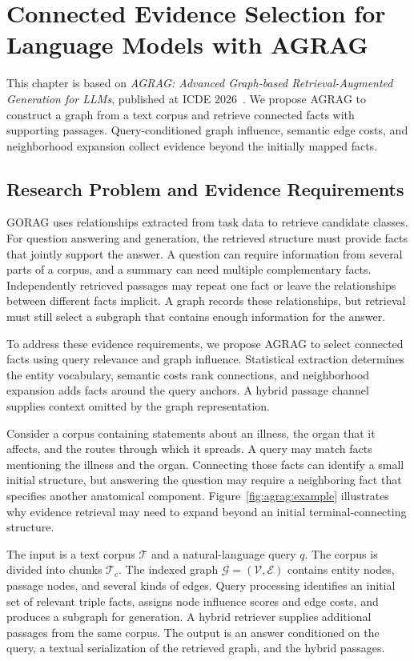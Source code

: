 \chapter{Connected Evidence Selection for Language Models with AGRAG}
\label{ch:agrag}

This chapter is based on \emph{AGRAG: Advanced Graph-based Retrieval-Augmented Generation for LLMs}, published at ICDE 2026~\cite{agrag-paper}. We propose AGRAG to construct a graph from a text corpus and retrieve connected facts with supporting passages. Query-conditioned graph influence, semantic edge costs, and neighborhood expansion collect evidence beyond the initially mapped facts.

\section{Research Problem and Evidence Requirements}
\label{sec:agrag:problem}
GORAG uses relationships extracted from task data to retrieve candidate classes. For question answering and generation, the retrieved structure must provide facts that jointly support the answer. A question can require information from several parts of a corpus, and a summary can need multiple complementary facts. Independently retrieved passages may repeat one fact or leave the relationships between different facts implicit. A graph records these relationships, but retrieval must still select a subgraph that contains enough information for the answer.

To address these evidence requirements, we propose AGRAG to select connected facts using query relevance and graph influence. Statistical extraction determines the entity vocabulary, semantic costs rank connections, and neighborhood expansion adds facts around the query anchors. A hybrid passage channel supplies context omitted by the graph representation.

Consider a corpus containing statements about an illness, the organ that it affects, and the routes through which it spreads. A query may match facts mentioning the illness and the organ. Connecting those facts can identify a small initial structure, but answering the question may require a neighboring fact that specifies another anatomical component. Figure~\ref{fig:agrag:example} illustrates why evidence retrieval may need to expand beyond an initial terminal-connecting structure.

The input is a text corpus $\mathcal{T}$ and a natural-language query $q$. The corpus is divided into chunks $\mathcal{T}_c$. The indexed graph $\mathcal{G}=(\mathcal{V},\mathcal{E})$ contains entity nodes, passage nodes, and several kinds of edges. Query processing identifies an initial set of relevant triple facts, assigns node influence scores and edge costs, and produces a subgraph for generation. A hybrid retriever supplies additional passages from the same corpus. The output is an answer conditioned on the query, a textual serialization of the retrieved graph, and the hybrid passages.

